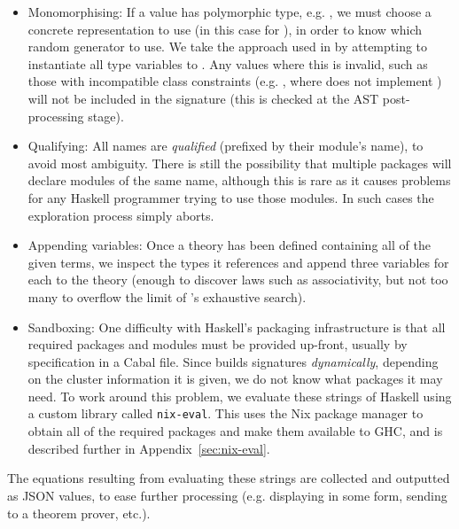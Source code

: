 \begin{itemize}
\item{Monomorphising}: If a value has polymorphic type, e.g. , we must choose a concrete representation to use (in this
  case for ), in order to know which random generator to use. We take the
  approach used in \quickcheck{} by attempting to instantiate all type variables to
  . Any values where this is invalid, such as those with
  incompatible class constraints (e.g. , where
   does not implement ) will not be included in the
  signature (this is checked at the AST post-processing stage).

\item{Qualifying}: All names are \emph{qualified} (prefixed by their module's
  name), to avoid most ambiguity. There is still the possibility that multiple
  packages will declare modules of the same name, although this is rare as it
  causes problems for any Haskell programmer trying to use those modules. In
  such cases the exploration process simply aborts.

\item{Appending variables}: Once a \quickspec{} theory has been defined containing
  all of the given terms, we inspect the types it references and append three
  variables for each to the theory (enough to discover laws such as
  associativity, but not too many to overflow the limit of \quickspec{}'s exhaustive
  search).

\item{Sandboxing}: One difficulty with Haskell's packaging infrastructure is
  that all required packages and modules must be provided up-front, usually by
  specification in a Cabal file. Since \mlspec{} builds signatures
  \emph{dynamically}, depending on the cluster information it is given, we do
  not know what packages it may need. To work around this problem, we evaluate
  these strings of Haskell using a custom library called \texttt{nix-eval}. This
  uses the Nix package manager to obtain all of the required packages and make
  them available to GHC, and is described further in
  Appendix~\ref{sec:nix-eval}.

\end{itemize}

The equations resulting from evaluating these strings are collected and
outputted as JSON values, to ease further processing (e.g. displaying in some
form, sending to a theorem prover, etc.).
\fi

